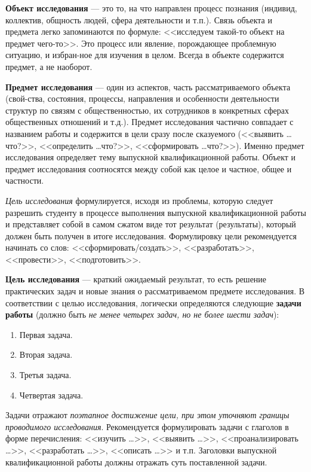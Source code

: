 \textbf{Объект исследования} --- это то, на что направлен процесс познания (индивид, коллектив, общность людей, сфера деятельности и т.п.). Связь объекта и предмета легко запоминаются по формуле: <<исследуем такой-то объект на предмет чего-то>>. Это процесс или явление, порождающее проблемную ситуацию, и избран-ное для изучения в целом. Всегда в объекте содержится предмет, а не наоборот. 

\textbf{Предмет исследования} --- один из аспектов, часть рассматриваемого объекта (свой-ства, состояния, процессы, направления и особенности деятельности структур по связям с общественностью, их сотрудников в конкретных сферах общественных отношений и т.д.). Предмет исследования частично совпадает с названием работы и содержится в цели сразу после сказуемого (<<выявить \ldots что?>>, <<определить \ldots что?>>, <<сформировать \ldots что?>>). Именно предмет исследования определяет тему выпускной квалификационной работы.
Объект и предмет исследования соотносятся между собой как целое и частное, общее и частности. 


\textit{Цель исследования} формулируется, исходя из проблемы, которую следует разрешить студенту в процессе выполнения выпускной квалификационной работы и представляет собой в самом сжатом виде тот результат (результаты), который должен быть получен в итоге исследования. Формулировку цели рекомендуется начинать со слов: <<сформировать/создать>>, <<разработать>>, <<провести>>, <<подготовить>>.

\textbf{Цель исследования} --- краткий ожидаемый результат, то есть решение практических задач и новые знания о рассматриваемом предмете исследования. 
В соответствии с целью исследования, логически определяются следующие \textbf{задачи работы} (должно быть \textit{не менее четырех задач, но не более шести задач}):

\begin{enumerate}
	\item Первая задача.
	\item Вторая задача.
	\item Третья задача.
	\item Четвертая задача.
\end{enumerate} 


Задачи отражают \textit{поэтапное достижение цели, при этом уточняют границы проводимого исследования}.
Рекомендуется формулировать задачи с глаголов в форме перечисления: <<изучить \ldots>>, <<выявить \ldots>>, <<проанализировать \ldots>>, <<разработать \ldots>>, <<описать \ldots>> и т.п. Заголовки выпускной квалификационной работы должны отражать суть поставленной задачи.


